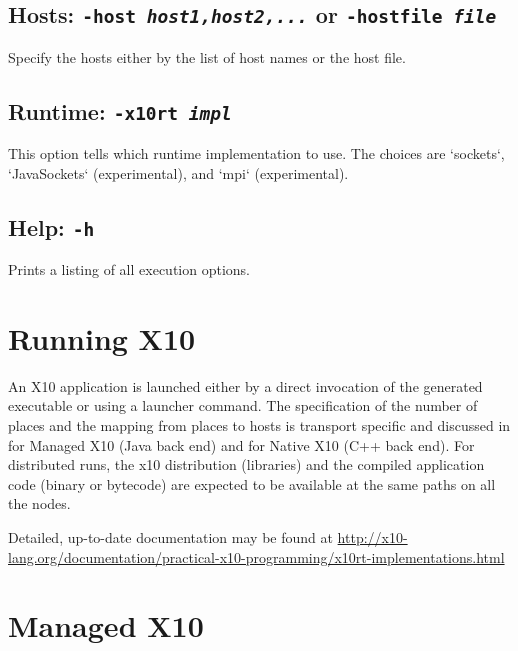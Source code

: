 \subsection{Hosts: {\tt -host {\em host1,host2,...}} or {\tt -hostfile {\em file}}}

Specify the hosts either by the list of host names or the host file.

\subsection{Runtime: {\tt -x10rt {\em impl}}}

This option tells which runtime implementation to use.  The choices are
\xcd`sockets`, \xcd`JavaSockets` (experimental), and \xcd`mpi` (experimental).

\subsection{Help: {\tt -h}}

Prints a listing of all execution options.





\section{Running X10}

An X10 application is launched either by a direct invocation of the generated
executable or using a launcher command. The specification of the number of
places and the mapping from places to hosts is transport specific and
discussed in  for Managed X10 (Java back end) and
 for Native X10 (C++ back end). For distributed runs,
the x10 distribution (libraries) and the compiled application code (binary or
bytecode) are expected to be available at the same paths on all the nodes.  

Detailed, up-to-date documentation may be found at
\url{http://x10-lang.org/documentation/practical-x10-programming/x10rt-implementations.html}


\section{Managed X10}
\label{sect:RunningManaged}



